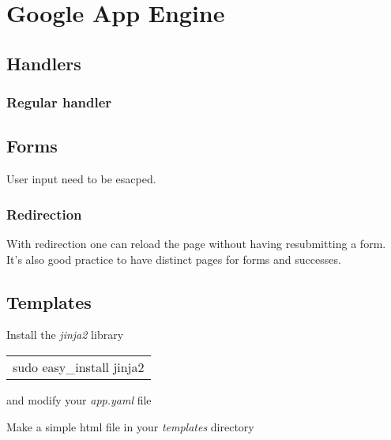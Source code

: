 \documentclass[12pt]{article}
\begin{document}
\section{Google App Engine}



\subsection{Handlers}

\subsubsection{Regular handler}





\subsection{Forms}



User input need to be esacped.





\subsubsection{Redirection}

With redirection one can reload the page without having resubmitting a form. It's also good practice to have distinct pages for forms and successes.



\subsection{Templates}

Install the \emph{jinja2} library

\begin{tabular}{l}
sudo easy\_install jinja2
\end{tabular}

and modify your \emph{app.yaml} file



Make a simple html file in your \emph{templates} directory
\end{document}
